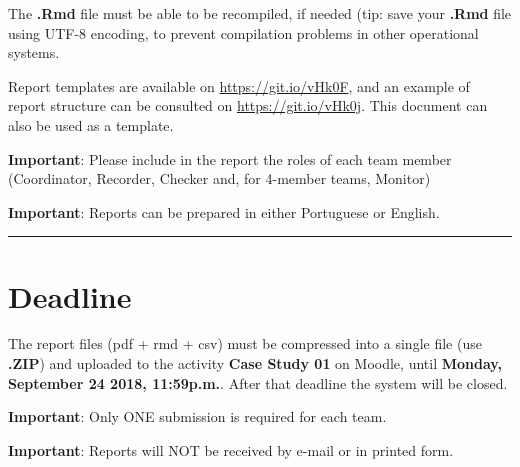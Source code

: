 \documentclass[11pt,twoside,printwatermark=false]{pinp}
\begin{document}
The \textbf{.Rmd} file must be able to be recompiled, if needed (tip:
save your \textbf{.Rmd} file using UTF-8 encoding, to prevent
compilation problems in other operational systems.

Report templates are available on \url{https://git.io/vHk0F}, and an
example of report structure can be consulted on
\url{https://git.io/vHk0j}. This document can also be used as a
template.

\textbf{Important}: Please include in the report the roles of each team
member (Coordinator, Recorder, Checker and, for 4-member teams, Monitor)

\textbf{Important}: Reports can be prepared in either Portuguese or
English.

\begin{center}\rule{0.5\linewidth}{\linethickness}\end{center}

\section{Deadline}\label{deadline}

The report files (pdf + rmd + csv) must be compressed into a single file
(use \textbf{.ZIP}) and uploaded to the activity \textbf{Case Study 01}
on Moodle, until \textbf{Monday, September 24 2018, 11:59p.m.}. After
that deadline the system will be closed.

\textbf{Important}: Only ONE submission is required for each team.

\textbf{Important}: Reports will NOT be received by e-mail or in printed
form.

\end{document}
